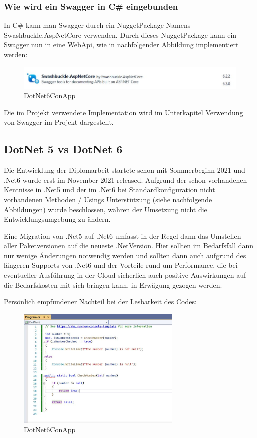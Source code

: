 \subsubsection*{Wie wird ein Swagger in C\# eingebunden}
In C\# kann man Swagger durch ein NuggetPackage Namens Swashbuckle.AspNetCore verwenden.
Durch dieses NuggetPackage kann ein Swagger nun in eine WebApi, wie in nachfolgender Abbildung implementiert werden:


\begin{figure}[H]
    \centering
    \includegraphics[width=1\textwidth]{./pics/SwaggerNuggetPackage.JPG}
    \caption{DotNet6ConApp}
\end{figure}


Die im Projekt verwendete Implementation wird im Unterkapitel Verwendung von Swagger im Projekt dargestellt.


\subsection {DotNet 5 vs DotNet 6}

Die Entwicklung der Diplomarbeit startete schon mit Sommerbeginn 2021 und .Net6 wurde erst im November 2021 released. 
Aufgrund der schon vorhandenen Kentnisse in .Net5 und der im .Net6 bei Standardkonfiguration nicht vorhandenen Methoden / Usings Unterstützung (siehe nachfolgende Abbildungen)
wurde beschlossen, währen der Umsetzung nicht die Entwicklungsumgebung zu ändern.

Eine Migration von .Net5 auf .Net6 umfasst in der Regel dann das Umstellen aller Paketversionen auf die neueste .NetVersion.
Hier sollten im Bedarfsfall dann nur wenige Änderungen notwendig werden und sollten dann auch aufgrund des längeren Supports von .Net6 
und der Vorteile rund um Performance, die bei eventueller Ausführung in der Cloud sicherlich auch positive Auswirkungen auf die 
Bedarfskosten mit sich bringen kann, in Erwägung gezogen werden.

Persönlich empfundener Nachteil bei der Lesbarkeit des Codes:

\begin{figure}[H]
    \centering
    \includegraphics[width=0.7\textwidth]{./pics/DotNet6ConApp.JPG}
    \caption{DotNet6ConApp}
\end{figure}


